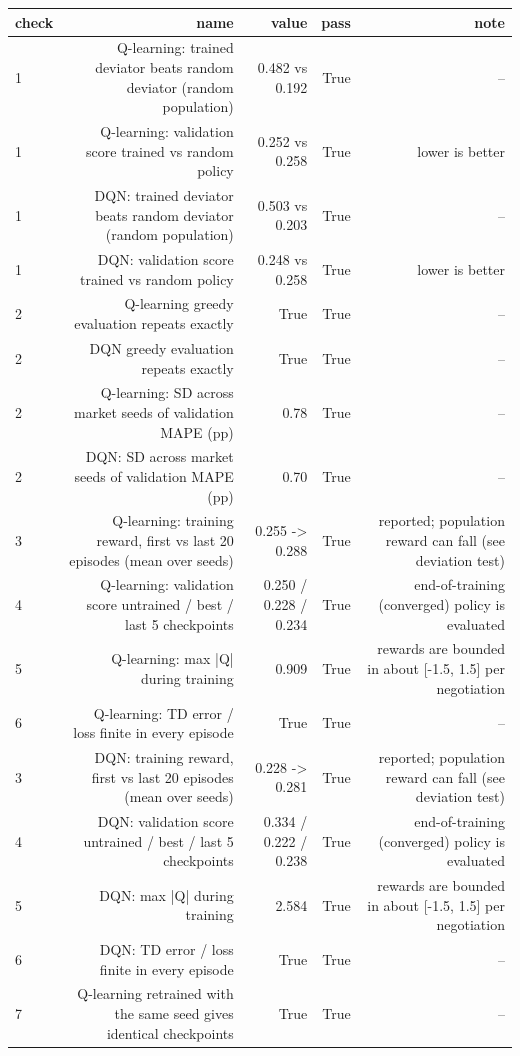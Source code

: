 \begin{tabular}{lrrrr}
\toprule
check & name & value & pass & note \\
\midrule
1 & Q-learning: trained deviator beats random deviator (random population) & 0.482 vs 0.192 & True & -- \\
1 & Q-learning: validation score trained vs random policy & 0.252 vs 0.258 & True & lower is better \\
1 & DQN: trained deviator beats random deviator (random population) & 0.503 vs 0.203 & True & -- \\
1 & DQN: validation score trained vs random policy & 0.248 vs 0.258 & True & lower is better \\
2 & Q-learning greedy evaluation repeats exactly & True & True & -- \\
2 & DQN greedy evaluation repeats exactly & True & True & -- \\
2 & Q-learning: SD across market seeds of validation MAPE (pp) & 0.78 & True & -- \\
2 & DQN: SD across market seeds of validation MAPE (pp) & 0.70 & True & -- \\
3 & Q-learning: training reward, first vs last 20 episodes (mean over seeds) & 0.255 -> 0.288 & True & reported; population reward can fall (see deviation test) \\
4 & Q-learning: validation score untrained / best / last 5 checkpoints & 0.250 / 0.228 / 0.234 & True & end-of-training (converged) policy is evaluated \\
5 & Q-learning: max |Q| during training & 0.909 & True & rewards are bounded in about [-1.5, 1.5] per negotiation \\
6 & Q-learning: TD error / loss finite in every episode & True & True & -- \\
3 & DQN: training reward, first vs last 20 episodes (mean over seeds) & 0.228 -> 0.281 & True & reported; population reward can fall (see deviation test) \\
4 & DQN: validation score untrained / best / last 5 checkpoints & 0.334 / 0.222 / 0.238 & True & end-of-training (converged) policy is evaluated \\
5 & DQN: max |Q| during training & 2.584 & True & rewards are bounded in about [-1.5, 1.5] per negotiation \\
6 & DQN: TD error / loss finite in every episode & True & True & -- \\
7 & Q-learning retrained with the same seed gives identical checkpoints & True & True & -- \\

\end{tabular}
